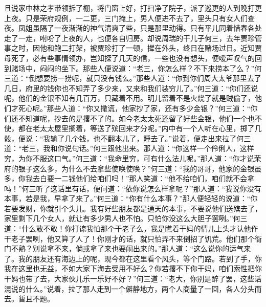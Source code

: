 \begin{parag}
    且说家中林之孝带领拆了棚，将门窗上好，打扫净了院子，派了巡更的人到晚打更上夜。只是荣府规例，一二更，三门掩上，男人便进不去了，里头只有女人们查夜。凤姐虽隔了一夜渐渐的神气清爽了些，只是那里动得。只有平儿同着惜春各处走了一走，咐吩了上夜的人，也便各自归房。却说周瑞的干儿子何三，去年贾珍管事之时，因他和鲍二打架，被贾珍打了一顿，撵在外头，终日在赌场过日。近知贾母死了，必有些事情领办，岂知探了几天的信，一些也没有想头，便嗳声叹气的回到赌场中，闷闷的坐下。那些人便说道：“老三，你怎么样？不下来捞本了么？”何三道：“倒想要捞一捞呢，就只没有钱么。”那些人道：“你到你们周大太爷那里去了几日，府里的钱你也不知弄了多少来，又来和我们装穷儿了。”何三道：“你们还说呢，他们的金银不知有几百万，只藏着不用。明儿留着不是火烧了就是贼偷了，他们才死心呢。”那些人道：“你又撒谎，他家抄了家，还有多少金银？”何三道：“你们还不知道呢，抄去的是撂不了的。如今老太太死还留了好些金银，他们一个也不使，都在老太太屋里搁着，等送了殡回来才分呢。”内中有一个人听在心里，掷了几骰，便说：“我输了几个钱，也不翻本儿了，睡去了。”说着，便走出来拉了何三道：“老三，我和你说句话。”何三跟他出来。那人道：“你这样一个伶俐人，这样穷，为你不服这口气。”何三道：“我命里穷，可有什么法儿呢。”那人道：“你才说荣府的银子这么多，为什么不去拿些使唤使唤？”何三道：“我的哥哥，他家的金银虽多，你我去白要一二钱他们给咱们吗！”那人笑道：“他不给咱们，咱们就不会拿吗！”何三听了这话里有话，便问道：“依你说怎么样拿呢？”那人道：“我说你没有本事，若是我，早拿了来了。”何三道：“你有什么本事？”那人便轻轻的说道：“你若要发财，你就引个头儿。我有好些朋友都是通天的本事，不要说他们送殡去了，家里剩下几个女人，就让有多少男人也不怕。只怕你没这么大胆子罢咧。”何三道：“什么敢不敢！你打谅我怕那个干老子么，我是瞧着干妈的情儿上头才认他作干老子罢咧，他又算了人了！你刚才的话，就只怕弄不来倒招了饥荒。他们那个衙门不熟？别说拿不来，倘或拿了来也要闹出来的。”那人道：“这么说你的运气来了。我的朋友还有海边上的呢，现今都在这里看个风头，等个门路。若到了手，你我在这里也无益，不如大家下海去受用不好么？你若撂不下你干妈，咱们索性把你干妈也带了去，大家伙儿乐一乐好不好？”何三道：“老大，你别是醉了罢，这些话混说的什么。”说着，拉了那人走到一个僻静地方，两个人商量了一回，各人分头而去。暂且不题。
\end{parag}


